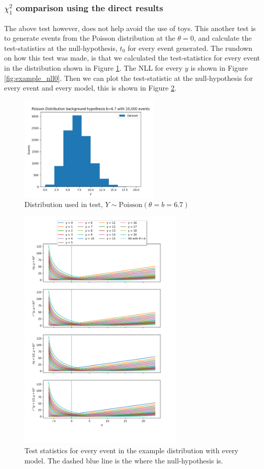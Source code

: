 \documentclass[14pt, a4paper]{article}  %
\begin{document}
\subsubsection{$\chi^2_1$ comparison using the direct results}
The above test however, does not help avoid the use of toys. This another test is to generate events from the Poisson distribution at the $\theta=0$, and calculate the test-statistics at the null-hypothesis, $t_0$ for every event generated. The rundown on how this test was made, is that we calculated the test-statistics for every event in the distribution shown in Figure \ref{fig:example_dist}. The NLL for every $y$ is shown in Figure \ref{fig:example_nll0}. Then we can plot the test-statistic at the null-hypothesis for every event and every model, this is shown in Figure \ref{fig:example_nlls}.
\begin{figure}[!ht]
	\centering
        \includegraphics[width=0.6\textwidth]{Poisson_approx/distribution.png}\caption{Distribution used in test, $Y\sim\text{Poisson}(\theta=b=6.7)$}\label{fig:example_dist}
\end{figure} 
\begin{figure}[!ht]
	\centering
        \includegraphics[width=0.7\textwidth]{Poisson_approx/nlls_event.png}\caption{Test statistics for every event in the example distribution with every model. The dashed blue line is the where the null-hypothesis is.}\label{fig:example_nlls}
\end{figure} 
\end{document}
